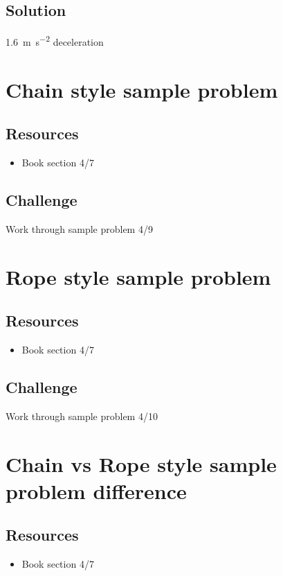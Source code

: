 \subsection*{Solution}
\SI{1.6}{\meter\per\square\second} deceleration




\newpage
\section{Chain style sample problem}

\subsection*{Resources}
\begin{itemize}
    \item Book section 4/7
\end{itemize}

\subsection*{Challenge}
Work through sample problem 4/9




\newpage
\section{Rope style sample problem}

\subsection*{Resources}
\begin{itemize}
    \item Book section 4/7
\end{itemize}

\subsection*{Challenge}
Work through sample problem 4/10




\newpage
\section{Chain vs Rope style sample problem difference}

\subsection*{Resources}
\begin{itemize}
    \item Book section 4/7
\end{itemize}

